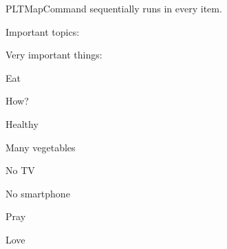 \documentclass[a4paper, 11pt]{article}
\begin{document}
\begin{macrodef}{PLTMapCommand}{}
     sequentially runs  in every item.
\end{macrodef}

\begin{example}{}
    Important topics: \PLTMapCommand{\showwithbullet}
\end{example}

\begin{example}{}

    \begin{importantlisting}
        Very important things:\par
        \item Eat%
        \begin{importantlisting}
            How?
            \item Healthy
            \item Many vegetables
            \item No TV
            \item No smartphone
        \end{importantlisting}
        \par
        \item Pray\par
        \item Love\par
    \end{importantlisting}
\end{example}
\end{document}
